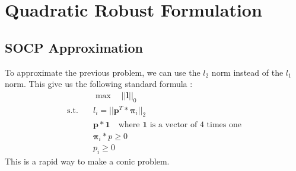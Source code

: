 \section{Quadratic Robust Formulation}
\setcounter{subsection}{10}
\subsection{SOCP Approximation}
To approximate the previous problem, we can use the $l_2$ norm instead of the $l_1$ norm. This give us the following standard formula : 
\begin{align*}
&\max \quad ||\textbf{l}||_0\\
\text{s.t.} \quad & l_i = ||\textbf{p}^T * \boldsymbol{\pi}_i||_2\\
  & \textbf{p} * \mathbf{1} \quad\text{where $\mathbf{1}$ is a vector of 4 times one} \\
  & \boldsymbol\pi_i*p \ge 0\\
  & p_i \ge 0
\end{align*}
This is a rapid way to make a conic problem.